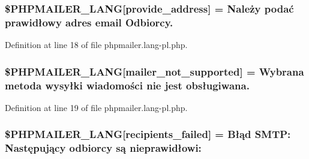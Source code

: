 \subsubsection[{\texorpdfstring{\$\+P\+H\+P\+M\+A\+I\+L\+E\+R\+\_\+\+L\+A\+NG}{$PHPMAILER_LANG}}]{\setlength{\rightskip}{0pt plus 5cm}\$P\+H\+P\+M\+A\+I\+L\+E\+R\+\_\+\+L\+A\+NG\mbox{[}\textquotesingle{}provide\+\_\+address\textquotesingle{}\mbox{]} = \textquotesingle{}Należy podać prawidłowy adres {\bf email} Odbiorcy.\textquotesingle{}}\hypertarget{phpmailer_8lang-pl_8php_a8b97897c2406b7392b056f375feeefbb}{}\label{phpmailer_8lang-pl_8php_a8b97897c2406b7392b056f375feeefbb}


Definition at line 18 of file phpmailer.\+lang-\/pl.\+php.

\subsubsection[{\texorpdfstring{\$\+P\+H\+P\+M\+A\+I\+L\+E\+R\+\_\+\+L\+A\+NG}{$PHPMAILER_LANG}}]{\setlength{\rightskip}{0pt plus 5cm}\$P\+H\+P\+M\+A\+I\+L\+E\+R\+\_\+\+L\+A\+NG\mbox{[}\textquotesingle{}mailer\+\_\+not\+\_\+supported\textquotesingle{}\mbox{]} = \textquotesingle{}Wybrana metoda wysyłki wiadomości nie jest obsługiwana.\textquotesingle{}}\hypertarget{phpmailer_8lang-pl_8php_aa2ebcb8833ee83a7ad67401c4bb3a6ad}{}\label{phpmailer_8lang-pl_8php_aa2ebcb8833ee83a7ad67401c4bb3a6ad}


Definition at line 19 of file phpmailer.\+lang-\/pl.\+php.

\subsubsection[{\texorpdfstring{\$\+P\+H\+P\+M\+A\+I\+L\+E\+R\+\_\+\+L\+A\+NG}{$PHPMAILER_LANG}}]{\setlength{\rightskip}{0pt plus 5cm}\$P\+H\+P\+M\+A\+I\+L\+E\+R\+\_\+\+L\+A\+NG\mbox{[}\textquotesingle{}recipients\+\_\+failed\textquotesingle{}\mbox{]} = \textquotesingle{}Błąd S\+M\+T\+P\+: Następujący odbiorcy są nieprawidłowi\+: \textquotesingle{}}\hypertarget{phpmailer_8lang-pl_8php_a7589d30bb9b368327c2df015f3e6bcba}{}\label{phpmailer_8lang-pl_8php_a7589d30bb9b368327c2df015f3e6bcba}


